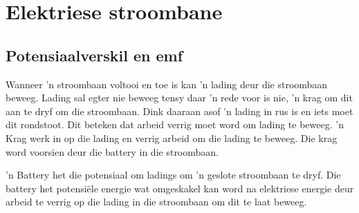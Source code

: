 \chapter{Elektriese stroombane}

\section{Potensiaalverskil en emf}

Wanneer  'n stroombaan voltooi en toe is kan  'n lading deur die stroombaan
beweeg. Lading sal egter nie beweeg tensy daar  'n rede voor is nie,  'n krag om
dit aan te dryf om die stroombaan. Dink daaraan asof  'n lading in rus is en iets
moet dit rondstoot. Dit beteken dat arbeid verrig moet word om lading te
beweeg.  'n Krag werk in op die lading en verrig arbeid om die lading te beweeg.
Die krag word voorsien deur die battery in die stroombaan.

 'n Battery het die potensiaal om ladings om  'n geslote stroombaan te dryf. Die
battery het potensi\"ele energie wat omgeskakel kan word na elektriese energie
deur arbeid te verrig op die lading in die stroombaan om dit te laat beweeg.\\


